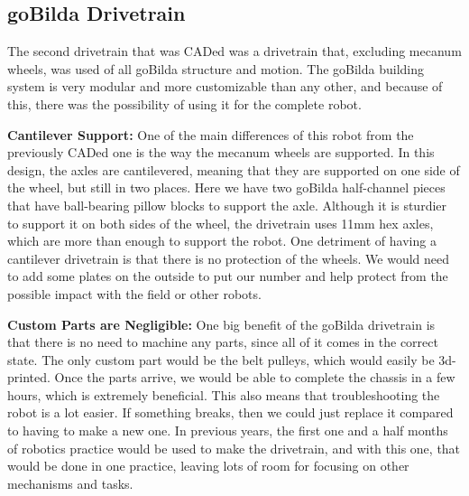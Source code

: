 

\subsection{goBilda Drivetrain}
\par The second drivetrain that was CADed was a drivetrain that, excluding mecanum wheels, was used of all goBilda structure and motion. The goBilda building system is very modular and more customizable than any other, and because of this, there was the possibility of using it for the complete robot.



\par \textbf{Cantilever Support:} One of the main differences of this robot from the previously CADed one is the way the mecanum wheels are supported. In this design, the axles are cantilevered, meaning that they are supported on one side of the wheel, but still in two places. Here we have two goBilda half-channel pieces that have ball-bearing pillow blocks to support the axle. Although it is sturdier to support it on both sides of the wheel, the drivetrain uses 11mm hex axles, which are more than enough to support the robot. One detriment of having a cantilever drivetrain is that there is no protection of the wheels. We would need to add some plates on the outside to put our number and help protect from the possible impact with the field or other robots.

\par \textbf{Custom Parts are Negligible:} One big benefit of the goBilda drivetrain is that there is no need to machine any parts, since all of it comes in the correct state. The only custom part would be the belt pulleys, which would easily be 3d-printed. Once the parts arrive, we would be able to complete the chassis in a few hours, which is extremely beneficial. This also means that troubleshooting the robot is a lot easier. If something breaks, then we could just replace it compared to having to make a new one. In previous years, the first one and a half months of robotics practice would be used to make the drivetrain, and with this one, that would be done in one practice, leaving lots of room for focusing on other mechanisms and tasks.
\newpage


